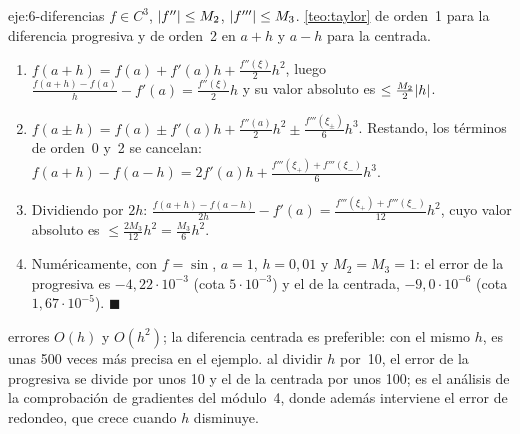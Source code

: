 \begin{solucion}{eje:6-diferencias}
\datos $f\in C^{3}$, $\lvert f''\rvert\le M_2$, $\lvert f'''\rvert\le M_3$.
\planteamiento \cref{teo:taylor} de orden~1 para la diferencia progresiva y de orden~2 en $a+h$ y $a-h$ para la centrada.
\pasos
\begin{enumerate}[label=\arabic*.]
  \item $f(a+h)=f(a)+f'(a)h+\frac{f''(\xi)}{2}h^{2}$, luego $\frac{f(a+h)-f(a)}{h}-f'(a)=\frac{f''(\xi)}{2}h$ y su valor absoluto es $\le\frac{M_2}{2}\lvert h\rvert$.
  \item $f(a\pm h)=f(a)\pm f'(a)h+\frac{f''(a)}{2}h^{2}\pm\frac{f'''(\xi_\pm)}{6}h^{3}$. Restando, los términos de orden~0 y~2 se cancelan: $f(a+h)-f(a-h)=2f'(a)h+\frac{f'''(\xi_+)+f'''(\xi_-)}{6}h^{3}$.
  \item Dividiendo por $2h$: $\frac{f(a+h)-f(a-h)}{2h}-f'(a)=\frac{f'''(\xi_+)+f'''(\xi_-)}{12}h^{2}$, cuyo valor absoluto es $\le\frac{2M_3}{12}h^{2}=\frac{M_3}{6}h^{2}$.
  \item Numéricamente, con $f=\sin$, $a=1$, $h=0{,}01$ y $M_2=M_3=1$: el error de la progresiva es $-4{,}22\cdot10^{-3}$ (cota $5\cdot10^{-3}$) y el de la centrada, $-9{,}0\cdot10^{-6}$ (cota $1{,}67\cdot10^{-5}$). \hfill$\blacksquare$
\end{enumerate}
\resultado errores $O(h)$ y $O(h^{2})$; la diferencia centrada es preferible: con el mismo $h$, es unas 500 veces más precisa en el ejemplo.
\comprobacion al dividir $h$ por~10, el error de la progresiva se divide por unos 10 y el de la centrada por unos 100; es el análisis de la comprobación de gradientes del módulo~4, donde además interviene el error de redondeo, que crece cuando $h$ disminuye.
\end{solucion}
